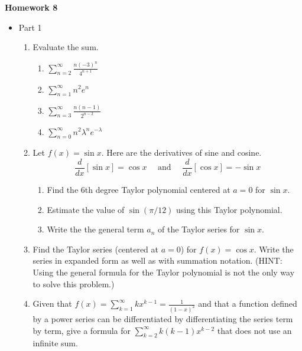\documentclass{article}
\begin{document}
\begin{center}
    \large \textbf{Homework 8}
\end{center}
        \begin{itemize}
            \item Part 1
                \begin{enumerate}
                    \item Evaluate the sum.
                        \begin{enumerate}
                            \item $\displaystyle \sum_{n=2}^\infty \frac{n(-3)^n}{4^{n+1}}$
                            \item $\displaystyle \sum_{n=1}^\infty {n^2e^n}$
                            \item $\displaystyle \sum_{n=3}^\infty \frac{n(n-1)}{2^{n-2}}$
                            \item $\displaystyle \sum_{n=0}^\infty n^2\lambda^n e^{-\lambda}$ 
                        \end{enumerate}
                    \item Let $f(x) = \sin x$.  Here are the derivatives of sine and cosine. $$\frac{d}{dx}[\sin x] = \cos x \quad \text{ and } \quad \frac{d}{dx}[\cos x] = -\sin x$$
                        \begin{enumerate}
                            \item Find the 6th degree Taylor polynomial centered at $a=0$ for $\sin x$.
                            \item Estimate the value of $\sin(\pi/12)$ using this Taylor polynomial.
                            \item Write the the general term $a_n$ of the Taylor series for $\sin x$.
                        \end{enumerate}
                    \item Find the Taylor series (centered at $a=0$) for $f(x) = \cos x$.  Write the series in expanded form as well as with summation notation.  (HINT: Using the general formula for the Taylor polynomial is not the only way to solve this problem.)
                    \item Given that $\displaystyle f(x) = \sum_{k=1}^{\infty} kx^{k-1} = \frac{1}{(1-x)^2}$ and that a function defined by a power series can be differentiated by differentiating the series term by term, give a formula for $\displaystyle \sum_{k=2}^\infty k(k-1)x^{k-2}$ that does not use an infinite sum.

\end{enumerate}
\end{itemize}
\end{document}
